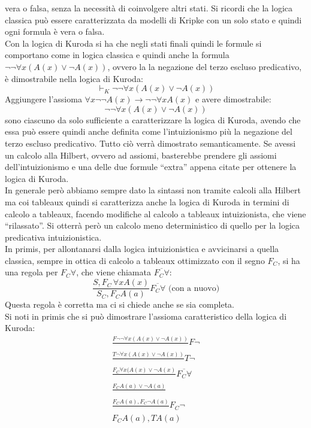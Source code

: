 \documentclass[a4paper,12pt, oneside]{book}
\begin{document}
vera o falsa, senza la necessità di coinvolgere altri stati. Si ricordi che la
logica classica può essere caratterizzata da modelli di Kripke con un solo
stato e quindi ogni formula è vera o falsa.\\
Con la logica di Kuroda si ha che negli stati finali quindi le formule si
comportano come in logica classica e quindi anche la formula $\neg\neg \forall x
(A(x)\lor\neg A(x))$, ovvero la la negazione del terzo escluso predicativo, è
dimostrabile nella logica di Kuroda: 
\[\vdash_K\neg\neg \forall x (A(x)\lor\neg A(x))\]
Aggiungere l'assioma $\forall x\neg\neg A(x)\to\neg\neg\forall xA(x)$ e avere
dimostrabile:
\[\neg\neg \forall x (A(x)\lor\neg A(x))\]
sono ciascuno da solo
sufficiente a caratterizzare la logica di Kuroda, avendo che essa può essere
quindi anche definita come l'intuizionismo più la negazione del terzo escluso
predicativo. Tutto ciò verrà dimostrato semanticamente.
Se avessi un calcolo alla Hilbert, ovvero ad assiomi, basterebbe prendere gli
assiomi dell'intuizionismo e una delle due formule ``extra'' appena citate per
ottenere la logica di Kuroda.\\
In generale però abbiamo sempre dato la sintassi non tramite calcoli alla
Hilbert ma coi tableaux quindi si caratterizza anche la logica di Kuroda in
termini di calcolo a tableaux, facendo modifiche al calcolo a tableaux
intuizionista, che viene ``rilassato''. Si otterrà però un calcolo meno
deterministico di quello per la logica predicativa intuizionistica. \\
In primis, per allontanarsi dalla logica intuizionistica e avvicinarsi a quella
classica, sempre in ottica di calcolo a tableaux ottimizzato con il segno $F_C$,
si ha una regola per $F_C\forall$, che viene chiamata $\overline{F_C\forall}$: 
\[\frac{S,F_C\,\forall x A(x)}{S_C,F_CA(a)}\overline{F_C\forall}\mbox{ (con a
    nuovo)}\] 
Questa regola è corretta ma ci si chiede anche se sia completa. \\
Si noti in primis che si può dimostrare l'assioma caratteristico della logica di
Kuroda:
\begin{gather*}
  \frac{F\neg\neg \forall x (A(x)\lor\neg A(x))}{}F\neg\\
  \frac{T\neg \forall x (A(x)\lor\neg A(x))}{}T\neg\\
  \frac{F_C \forall x (A(x)\lor\neg A(x)}{}\overline{F_C\forall}\\
  \frac{F_C A(a)\lor\neg A(a)}{}\\
  \frac{F_C A(a), F_C\neg A(a)}{}F_C\neg\\
  F_C A(a), TA(a)
\end{gather*}
\end{document}
